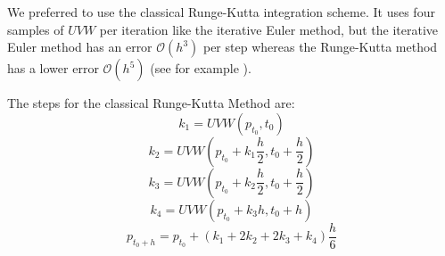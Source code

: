 We preferred to use the classical Runge-Kutta integration scheme. It uses four samples of $UVW$ per iteration like the iterative Euler method, but %
the iterative Euler method has an error $\mathcal{O}(h^3)$ per step whereas the Runge-Kutta method has a lower error $\mathcal{O}(h^5)$ (see for example \cite{src:numerical_recipes}).

The steps for the classical Runge-Kutta Method are:
\begin{equation}
	k_1 = UVW(p_{t_0}, t_0)
\end{equation}
\begin{equation}
	k_2 = UVW(p_{t_0} + k_1 \frac{h}{2}, t_0 + \frac{h}{2})
\end{equation}
\begin{equation}
	k_3 = UVW(p_{t_0} + k_2 \frac{h}{2}, t_0 + \frac{h}{2})
\end{equation}
\begin{equation}
	k_4 = UVW(p_{t_0} + k_3 h, t_0 + h)
\end{equation}
\begin{equation}
	p_{t_0 + h} = p_{t_0} + (k_1 + 2 k_2 + 2 k_3 + k_4) \frac{h}{6}
\end{equation}

